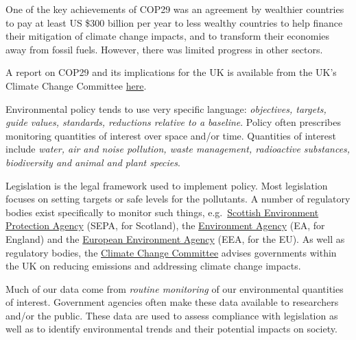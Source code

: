 \documentclass[
  letterpaper,
  DIV=11,
  numbers=noendperiod]{scrartcl}
\begin{document}
\begin{tcolorbox}
One of the key achievements of COP29 was an agreement by wealthier
countries to pay at least US \$300 billion per year to less wealthy
countries to help finance their mitigation of climate change impacts,
and to transform their economies away from fossil fuels. However, there
was limited progress in other sectors.

A report on COP29 and its implications for the UK is available from the
UK's Climate Change Committee
\href{https://www.theccc.org.uk/publication/cop29-key-outcomes-and-next-steps-for-the-uk/}{here}.

\end{tcolorbox}

Environmental policy tends to use very specific language:
\emph{objectives, targets, guide values, standards, reductions relative
to a baseline}. Policy often prescribes monitoring quantities of
interest over space and/or time. Quantities of interest include
\emph{water, air and noise pollution, waste management, radioactive
substances, biodiversity and animal and plant species}.

Legislation is the legal framework used to implement policy. Most
legislation focuses on setting targets or safe levels for the
pollutants. A number of regulatory bodies exist specifically to monitor
such things,
e.g.~\href{https://beta.sepa.scot/about-sepa/who-we-are/}{Scottish
Environment Protection Agency} (SEPA, for Scotland), the
\href{https://www.gov.uk/government/organisations/environment-agency/about}{Environment
Agency} (EA, for England) and the
\href{https://www.eea.europa.eu/en}{European Environment Agency} (EEA,
for the EU). As well as regulatory bodies, the
\href{https://www.theccc.org.uk/about/}{Climate Change Committee}
advises governments within the UK on reducing emissions and addressing
climate change impacts.

Much of our data come from \emph{routine monitoring} of our
environmental quantities of interest. Government agencies often make
these data available to researchers and/or the public. These data are
used to assess compliance with legislation as well as to identify
environmental trends and their potential impacts on society.
\end{document}
